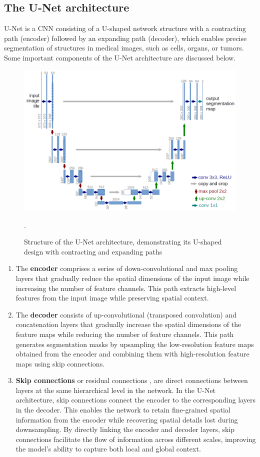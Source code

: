 \subsection{The U-Net architecture}
U-Net \cite{unet} is a CNN consisting of a U-shaped network structure with a contracting path (encoder) followed by an expanding path (decoder), which enables precise segmentation of structures in medical images, such as cells, organs, or tumors. Some important components of the U-Net architecture are discussed below. 
\begin{figure}[ht]
    \centering
    \includegraphics[width=12cm]{images/Theory-DL/UNet.png}
    \caption{Structure of the U-Net architecture, demonstrating its U-shaped design with contracting and expanding paths \cite{unet}}.
    \label{fig:UNet}
\end{figure}
\begin{enumerate}
  \item The \textbf{encoder} comprises a series of down-convolutional and max pooling layers that gradually reduce the spatial dimensions of the input image while increasing the number of feature channels. This path extracts high-level features from the input image while preserving spatial context.
  \item The \textbf{decoder} consists of up-convolutional (transposed convolution) and concatenation layers that gradually increase the spatial dimensions of the feature maps while reducing the number of feature channels. This path generates segmentation masks by upsampling the low-resolution feature maps obtained from the encoder and combining them with high-resolution feature maps using skip connections.
  \item \textbf{Skip connections} or residual connections \cite{he2016deep}, are direct connections between layers at the same hierarchical level in the network. In the U-Net architecture, skip connections connect the encoder to the corresponding layers in the decoder. This enables the network to retain fine-grained spatial information from the encoder while recovering spatial details lost during downsampling. By directly linking the encoder and decoder layers, skip connections facilitate the flow of information across different scales, improving the model's ability to capture both local and global context.
\end{enumerate}
